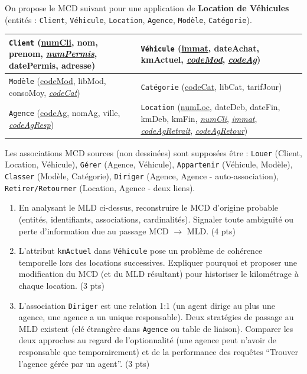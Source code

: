 \documentclass[11pt]{article}
\begin{document}
\begin{exercice}
On propose le MCD suivant pour une application de \textbf{Location de Véhicules} (entités : \texttt{Client}, \texttt{Véhicule}, \texttt{Location}, \texttt{Agence}, \texttt{Modèle}, \texttt{Catégorie}). 
\begin{center}
\providecommand{\tcode}[1]{\texttt{#1}}
\providecommand{\pk}[1]{\underline{#1}}         %
\providecommand{\fk}[1]{\textit{\underline{#1}}} %

\begin{tabular}{|l|l|}
\hline
\tcode{Client} (\pk{numCli}, nom, prenom, \fk{numPermis}, datePermis, adresse) & \tcode{Véhicule} (\pk{immat}, dateAchat, kmActuel, \fk{codeMod}, \fk{codeAg}) \\
\hline
\tcode{Modèle} (\pk{codeMod}, libMod, consoMoy, \fk{codeCat}) & \tcode{Catégorie} (\pk{codeCat}, libCat, tarifJour) \\
\hline
\tcode{Agence} (\pk{codeAg}, nomAg, ville, \fk{codeAgResp}) & \tcode{Location} (\pk{numLoc}, dateDeb, dateFin, kmDeb, kmFin, \fk{numCli}, \fk{immat}, \fk{codeAgRetrait}, \fk{codeAgRetour}) \\
\hline
\end{tabular}
\end{center}
Les associations MCD sources (non dessinées) sont supposées être : \texttt{Louer} (Client, Location, Véhicule), \texttt{Gérer} (Agence, Véhicule), \texttt{Appartenir} (Véhicule, Modèle), \texttt{Classer} (Modèle, Catégorie), \texttt{Diriger} (Agence, Agence - auto-association), \texttt{Retirer/Retourner} (Location, Agence - deux liens).
\begin{enumerate}
    \item En analysant le MLD ci-dessus, reconstruire le MCD d'origine probable (entités, identifiants, associations, cardinalités). Signaler toute ambiguïté ou perte d'information due au passage MCD $\to$ MLD. (4 pts)
    \item L'attribut \texttt{kmActuel} dans \texttt{Véhicule} pose un problème de cohérence temporelle lors des locations successives. Expliquer pourquoi et proposer une modification du MCD (et du MLD résultant) pour historiser le kilométrage à chaque location. (3 pts)
    \item L'association \texttt{Diriger} est une relation 1:1 (un agent dirige au plus une agence, une agence a un unique responsable). Deux stratégies de passage au MLD existent (clé étrangère dans \texttt{Agence} ou table de liaison). Comparer les deux approches au regard de l'optionnalité (une agence peut n'avoir de responsable que temporairement) et de la performance des requêtes ``Trouver l'agence gérée par un agent''. (3 pts)

\end{enumerate}
\end{exercice}
\end{document}

